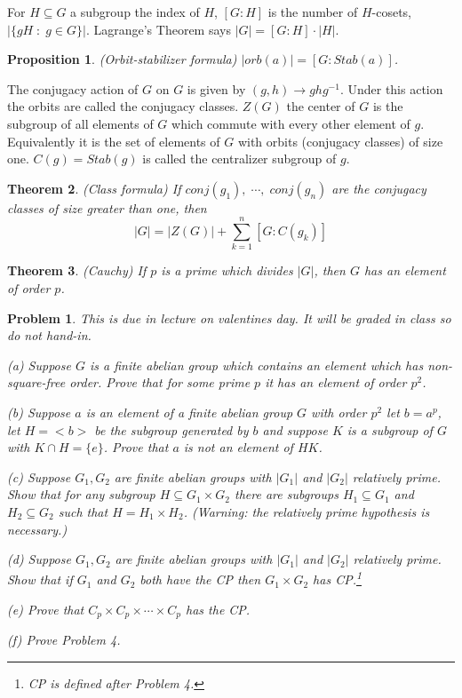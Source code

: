 \documentclass[12pt]{article}
\def\su{\subseteq}
\def\st{\;:\;}
\newtheorem{theorem}{Theorem}
\newtheorem{prop}[theorem]{Proposition}
\newtheorem{prob}{Problem}
\begin{document}
For $H\su G$ a subgroup the index of $H$, $[G:H]$ is the
number of $H$-cosets, $|\{gH\st g\in G\}|$.  Lagrange's
Theorem says $|G|=[G:H]\cdot |H|$.

\begin{prop}
(Orbit-stabilizer formula) $|orb(a)|=[G:Stab(a)]$.
\end{prop}

The conjugacy action of $G$ on $G$ is given by $(g,h) \to ghg^{-1}$.
Under this action the orbits are called the conjugacy classes.
$Z(G)$ the center of $G$ is the subgroup of all elements of
$G$ which commute with every other element of $g$.  Equivalently
it is the set of elements of $G$ with orbits (conjugacy classes) 
of size one. $C(g)=Stab(g)$ is called the centralizer subgroup of $g$.

\begin{theorem}
(Class formula) If $conj(g_1),\;\cdots, \; conj(g_n)$ are the
conjugacy classes of size greater
than one, then
$$|G|=|Z(G)| +\sum_{k=1}^n [G:C(g_k)]$$
\end{theorem}

\begin{theorem}
(Cauchy) If $p$ is a prime which divides $|G|$, then $G$ has
an element of order $p$.
\end{theorem}

\begin{prob}
This is due in lecture on valentines day.  It will be graded
in class so do not hand-in.

\par\noindent (a) Suppose $G$ is a finite abelian group which contains an
element which has non-square-free order. Prove that for some prime
$p$ it has an element of order $p^2$.
\par\noindent (b) Suppose $a$ is an element of a finite abelian group $G$ with
order $p^2$ let $b=a^p$, let $H=<b>$ be the subgroup generated
by $b$ and suppose $K$ is a subgroup of $G$ with $K\cap H=\{e\}$.
Prove that $a$ is not an element of $HK$.
\par\noindent (c) Suppose $G_1,G_2$ are finite abelian groups with $|G_1|$ and
$|G_2|$ relatively prime.  Show that for any subgroup $H\su G_1\times G_2$
there are subgroups $H_1\su G_1$ and $H_2\su G_2$ such that
$H=H_1\times H_2$.   (Warning: the relatively prime hypothesis is
necessary.)
\par\noindent (d) Suppose $G_1,G_2$ are finite abelian groups with $|G_1|$ and
$|G_2|$ relatively prime.  Show that if $G_1$ and $G_2$ both have
the CP then $G_1\times G_2$ has CP.\footnote{CP is defined after Problem 4.}
\par\noindent (e) Prove that $C_p\times C_p\times \cdots \times C_p$ has the CP.
\par\noindent (f) Prove Problem 4.

\end{prob}
\end{document}
